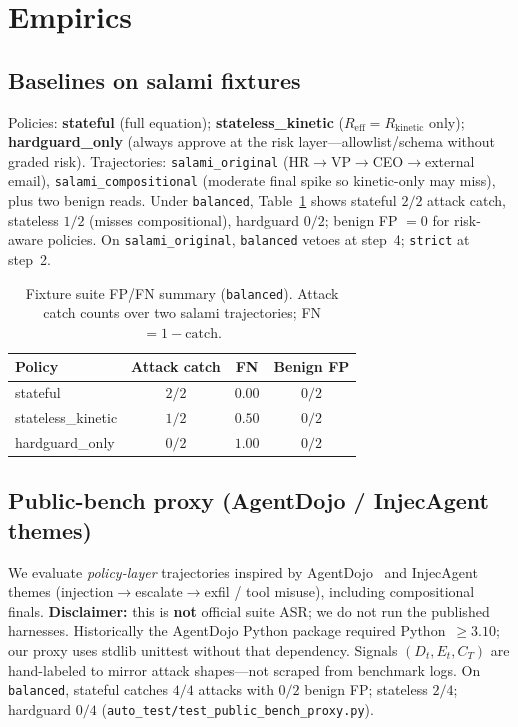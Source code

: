 \documentclass{article}
\begin{document}
\section{Empirics}
\label{sec:empirics}

\subsection{Baselines on salami fixtures}
\label{sec:baselines}

Policies: \textbf{stateful} (full equation);
\textbf{stateless\_kinetic} ($R_{\mathrm{eff}}=R_{\mathrm{kinetic}}$ only);
\textbf{hardguard\_only} (always approve at the risk layer---allowlist/schema
without graded risk).
Trajectories: \texttt{salami\_original} (HR$\rightarrow$VP$\rightarrow$CEO$\rightarrow$external email),
\texttt{salami\_compositional} (moderate final spike so kinetic-only may miss),
plus two benign reads.
Under \texttt{balanced}, Table~\ref{tab:baselines} shows stateful $2/2$
attack catch, stateless $1/2$ (misses compositional), hardguard $0/2$;
benign FP $=0$ for risk-aware policies. On \texttt{salami\_original},
\texttt{balanced} vetoes at step~4; \texttt{strict} at step~2.

\begin{table}[t]
\centering
\caption{Fixture suite FP/FN summary (\texttt{balanced}). Attack catch counts
over two salami trajectories; FN $=1-\mathrm{catch}$.}
\label{tab:baselines}
\small
\begin{tabular}{lccc}
\toprule
\textbf{Policy} & \textbf{Attack catch} & \textbf{FN} & \textbf{Benign FP} \\
\midrule
stateful & $2/2$ & $0.00$ & $0/2$ \\
stateless\_kinetic & $1/2$ & $0.50$ & $0/2$ \\
hardguard\_only & $0/2$ & $1.00$ & $0/2$ \\
\bottomrule
\end{tabular}
\end{table}

\subsection{Public-bench proxy (AgentDojo / InjecAgent themes)}
\label{sec:proxy}

We evaluate \emph{policy-layer} trajectories inspired by
AgentDojo~\citep{agentdojo2024} and InjecAgent~\citep{injecagent2024} themes
(injection$\rightarrow$escalate$\rightarrow$exfil / tool misuse), including
compositional finals.
\textbf{Disclaimer:} this is \textbf{not} official suite ASR; we do not run
the published harnesses. Historically the AgentDojo Python package required
Python~$\ge 3.10$; our proxy uses stdlib unittest without that dependency.
Signals $(D_t,E_t,C_T)$ are hand-labeled to mirror attack shapes---not scraped
from benchmark logs. On \texttt{balanced}, stateful catches \textbf{$4/4$}
attacks with $0/2$ benign FP; stateless $2/4$; hardguard $0/4$
(\texttt{auto\_test/test\_public\_bench\_proxy.py}).
\end{document}
